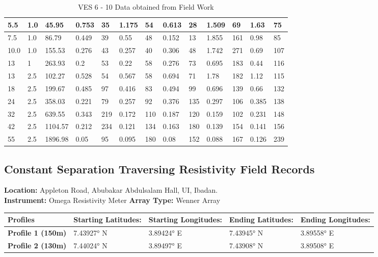 \documentclass[12pt,a4paper]{report}
\begin{document}
\begin{table}[h!]
\begin{adjustbox}{max width=\textwidth}
\begin{tabular}{|p{2.5cm}|p{2.5cm}|p{2.5cm}|p{1.5cm}|p{1.8cm}|p{1.5cm}|p{1.8cm}|p{1.5cm}|p{1.8cm}|p{1.5cm}|p{1.8cm}|p{1.5cm}|p{1.8cm}|}
    5.5 & 1.0 & 45.95 & 0.753 & 35 & 1.175 & 54 & 0.613 & 28 & 1.509 & 69 & 1.63 & 75 \\ \hline
    7.5 & 1.0 & 86.79 & 0.449 & 39 & 0.55 & 48 & 0.152 & 13 & 1.855 & 161 & 0.98 & 85 \\ \hline
    10.0 & 1.0 & 155.53 & 0.276 & 43 & 0.257 & 40 & 0.306 & 48 & 1.742 & 271 & 0.69 & 107 \\ \hline
    13 & 1 & 263.93 & 0.2 & 53 & 0.22 & 58 & 0.276 & 73 & 0.695 & 183 & 0.44 & 116 \\ \hline
    13 & 2.5 & 102.27 & 0.528 & 54 & 0.567 & 58 & 0.694 & 71 & 1.78 & 182 & 1.12 & 115 \\ \hline
    18 & 2.5 & 199.67 & 0.485 & 97 & 0.416 & 83 & 0.494 & 99 & 0.696 & 139 & 0.66 & 132 \\ \hline
    24 & 2.5 & 358.03 & 0.221 & 79 & 0.257 & 92 & 0.376 & 135 & 0.297 & 106 & 0.385 & 138 \\ \hline
    32 & 2.5 & 639.55 & 0.343 & 219 & 0.172 & 110 & 0.187 & 120 & 0.159 & 102 & 0.231 & 148 \\ \hline
    42 & 2.5 & 1104.57 & 0.212 & 234 & 0.121 & 134 & 0.163 & 180 & 0.139 & 154 & 0.141 & 156 \\ \hline
    55 & 2.5 & 1896.98 & 0.05 & 95 & 0.095 & 180 & 0.08 & 152 & 0.088 & 167 & 0.126 & 239 \\ \hline
    \end{tabular}
    \end{adjustbox}
    \caption{VES 6 - 10 Data obtained from Field Work}
    \label{tab:aah_ves-6-10}
\end{table}


\subsection{Constant Separation Traversing Resistivity Field Records}
\textbf{Location:} {Appleton Road, Abubakar Abdulsalam Hall, UI, Ibadan.} \\
\textbf{Instrument:} {Omega Resistivity Meter}
\textbf{Array Type:} {Wenner Array }

\begin{table}[h!]
    \begin{adjustbox}{max width=\textwidth}
    \renewcommand{\arraystretch}{1.5}
    \begin{tabular}{|p{3.3cm}|p{2.5cm}|p{2.5cm}|p{2.5cm}|p{2.5cm}|}
    \hline
    \textbf{Profiles} &  
    \textbf{Starting Latitudes:} & 
    \textbf{Starting Longitudes:} & 
    \textbf{Ending Latitudes:} &
    \textbf{Ending Longitudes:} \\
    \hline
    \textbf{Profile 1 (150m)} & 7.43927° N & 3.89424° E & 7.43945° N & 3.89558° E  \\ \hline
    \textbf{Profile 2 (130m)} & 7.44024° N & 3.89497° E & 7.43908° N & 3.89508° E \\ \hline
    \end{tabular}
    \end{adjustbox}
    \label{tab:AAH CST Coordinates: 1-0}
\end{table}
\end{document}
